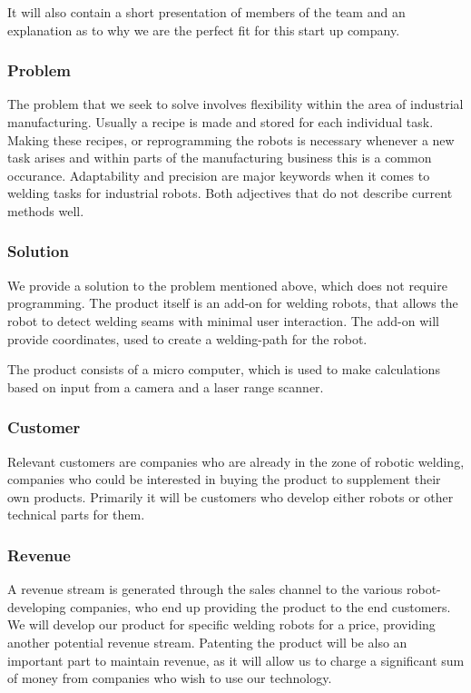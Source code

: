 It will also contain a short presentation of members of the team and an explanation as to why we are the perfect fit for this start up company.

\subsubsection{Problem}
The problem that we seek to solve involves flexibility within the area of industrial manufacturing. Usually a recipe is made and stored for each individual task.
Making these recipes, or reprogramming the robots is necessary whenever a new task arises and within parts of the manufacturing business this is a common occurance. 
Adaptability and precision are major keywords when it comes to welding tasks for industrial robots. Both adjectives that do not describe current methods well.

\subsubsection{Solution}
We provide a solution to the problem mentioned above, which does not require programming. The product itself is an add-on for welding robots, that allows the robot to detect welding seams with minimal user interaction. The add-on will provide coordinates, used to create a welding-path for the robot. 

The product consists of a micro computer, which is used to make calculations based on input from a camera and a laser range scanner. 

\subsubsection{Customer}
Relevant customers are companies who are already in the zone of robotic welding, companies who could be interested in buying the product to supplement their own products. Primarily it will be customers who develop either robots or other technical parts for them.  

\subsubsection{Revenue}
A revenue stream is generated through the sales channel to the various robot-developing companies, who end up providing the product to the end customers.
We will develop our product for specific welding robots for a price, providing another potential revenue stream. 
Patenting the product will be also an important part to maintain revenue, as it will allow us to charge a significant sum of money from companies who wish to use our technology.


